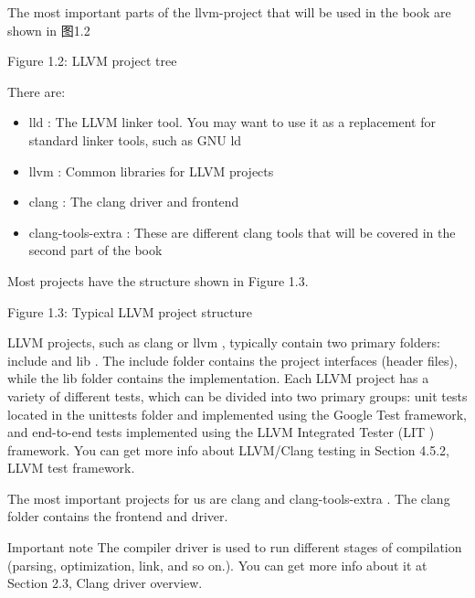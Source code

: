 The most important parts of the llvm-project that will be used in the book are shown in 图1.2


\begin{center}
Figure 1.2: LLVM project tree
\end{center}

There are:

\begin{itemize}
\item
lld : The LLVM linker tool. You may want to use it as a replacement for standard linker tools, such as GNU ld

\item
llvm : Common libraries for LLVM projects

\item
clang : The clang driver and frontend

\item
clang-tools-extra : These are different clang tools that will be covered in the second part of the book
\end{itemize}

Most projects have the structure shown in Figure 1.3.


\begin{center}
Figure 1.3: Typical LLVM project structure
\end{center}

LLVM projects, such as clang or llvm , typically contain two primary folders: include and lib . The include folder contains the project interfaces (header files), while the lib folder contains the implementation. Each LLVM project has a variety of different tests, which can be divided into two primary groups: unit tests located in the unittests folder and implemented using the Google Test framework, and end-to-end tests implemented using the LLVM Integrated Tester (LIT ) framework. You can get more info about LLVM/Clang testing in Section 4.5.2, LLVM test framework.

The most important projects for us are clang and clang-tools-extra . The clang folder contains the frontend and driver.

\begin{myNotic}{Important note}
The compiler driver is used to run different stages of compilation (parsing, optimization, link, and so on.). You can get more info about it at Section 2.3, Clang driver overview.
\end{myNotic}


